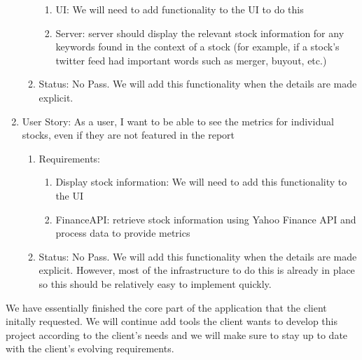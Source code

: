 \documentclass[12pt,a4paper]{article}
\begin{document}
\begin{enumerate}
\begin{enumerate}
\begin{enumerate}
\item UI: We will need to add functionality to the UI to do this
\item Server: server should display the relevant stock information for any keywords found in the context of a stock (for example, if a stock's twitter feed had important words such as merger, buyout, etc.)
\end{enumerate}
\item Status: No Pass. We will add this functionality when the details are made  explicit.
\end{enumerate}
\item User Story: As a user, I want to be able to see the metrics for individual stocks, even if they are not featured in the report
\begin{enumerate}
\item Requirements:
\begin{enumerate}
\item Display stock information: We will need to add this functionality to the UI
\item FinanceAPI: retrieve stock information using Yahoo Finance API and process data to provide metrics
\end{enumerate}
\item Status: No Pass. We will add this functionality when the details are made explicit. However,  most of the infrastructure to do this is already in place so this should be relatively easy to implement quickly.
\end{enumerate}
\end{enumerate}

We have essentially finished the core part of the application that the client initally requested. We will continue add tools the client wants to develop this project according to the client's needs and we will make sure to stay up to date with the client's evolving requirements. 
\end{document}
